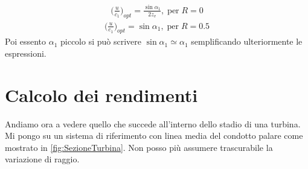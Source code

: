 \begin{align*}
\bigg( \frac{u}{c_1} \bigg)_{opt} = \frac{\sin \alpha_1}{2 z_v}, \; \mbox{per} \; R = 0
\end{align*}
\begin{align*}
\bigg( \frac{u}{c_1} \bigg)_{opt} = \sin \alpha_1, \; \mbox{per} \; R = 0.5
\end{align*}
Poi essento $\alpha_1$ piccolo si può scrivere $ \sin \alpha_1 \simeq \alpha_1$ semplificando ulteriormente le espressioni.

\section{Calcolo dei rendimenti}
Andiamo ora a vedere quello che succede all'interno dello stadio di una turbina. Mi pongo su un sistema di riferimento con linea media del condotto palare come mostrato in \ref{fig:SezioneTurbina}. Non posso più assumere trascurabile la variazione di raggio. 
